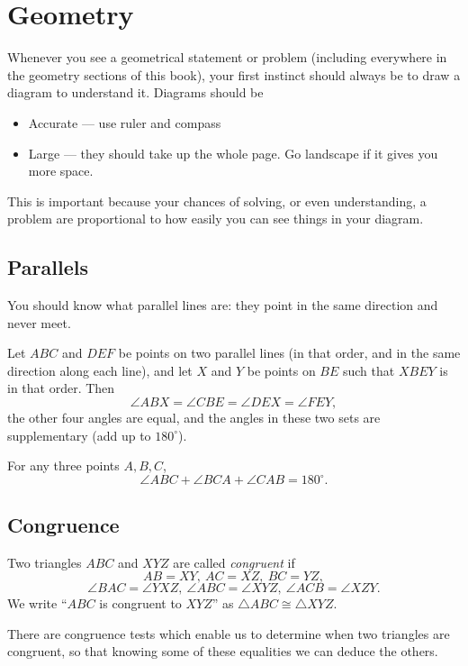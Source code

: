 \section{Geometry}
Whenever you see a geometrical statement or problem (including everywhere in the
geometry sections of this book), your first instinct should
always be to draw a diagram to understand it. Diagrams should be
\begin{itemize}
  \item Accurate --- use ruler and compass
  \item Large --- they should take up the whole page. Go landscape if it gives
    you more space.
\end{itemize}
This is important because your chances of solving, or even understanding, a
problem are proportional to how easily you can see things in your diagram.
\subsection{Parallels}
You should know what parallel lines are: they point in the same direction and
never meet.

Let $ABC$ and $DEF$ be points on two parallel lines (in that order, and in the
same direction along each line), and let
$X$ and $Y$ be points on $BE$ such that $XBEY$ is in that order.
Then
\[\angle ABX=\angle CBE=\angle DEX=\angle FEY,\] the other four angles are
equal, and the angles in these two sets are supplementary (add up to 
$180^\circ$).
\begin{result}{\label{r:b:g:p:1}}
  For any three points $A, B, C$, \[\angle ABC+\angle
  BCA+\angle CAB=180^\circ.\]
\end{result}
\subsection{Congruence}
Two triangles $ABC$ and $XYZ$ are called \emph{congruent} if \[AB=XY,\ AC=XZ,\
BC=YZ,\]
\[\angle BAC=\angle YXZ,\ \angle ABC=\angle XYZ,\ \angle ACB=\angle
XZY.\]
We write ``$ABC$ is congruent to $XYZ$'' as $\triangle ABC\cong\triangle XYZ$.

There are congruence tests which enable us to determine when two triangles are
congruent, so that knowing some of these equalities we can deduce the others.

